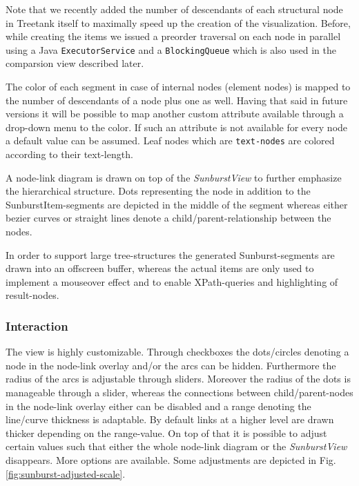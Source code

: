 \begin{itemize}
Note that we recently added the number of descendants of each structural node in Treetank itself to maximally speed up the creation of the visualization. Before, while creating the items we issued a preorder traversal on each node in parallel using a Java \texttt{ExecutorService} and a \texttt{BlockingQueue} which is also used in the comparsion view described later.


The color of each segment in case of internal nodes (element nodes) is mapped to the number of descendants of a node plus one as well. Having that said in future versions it will be possible to map another custom attribute available through a drop-down menu to the color. If such an attribute is not available for every node a default value can be assumed. Leaf nodes which are \texttt{text-nodes} are colored according to their text-length.

A node-link diagram is drawn on top of the \emph{SunburstView} to further emphasize the hierarchical structure. Dots representing the node in addition to the SunburstItem-segments are depicted in the middle of the segment whereas either bezier curves or straight lines denote a child/parent-relationship between the nodes.

In order to support large tree-structures the generated Sunburst-segments are drawn into an offscreen buffer, whereas the actual items are only used to implement a mouseover effect and to enable XPath-queries and highlighting of result-nodes.

\subsubsection{Interaction}
The view is highly customizable. Through checkboxes the dots/circles denoting a node in the node-link overlay and/or the arcs can be hidden. Furthermore the radius of the arcs is adjustable through sliders. Moreover the radius of the dots is manageable through a slider, whereas the connections between child/parent-nodes in the node-link overlay either can be disabled and a range denoting the line/curve thickness is adaptable. By default links at a higher level are drawn thicker depending on the range-value. On top of that it is possible to adjust certain values such that either the whole node-link diagram or the \emph{SunburstView} disappears. More options are available. Some adjustments are depicted in Fig. \ref{fig:sunburst-adjusted-scale}.


\end{itemize}
